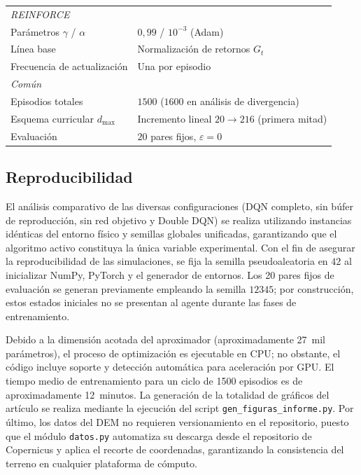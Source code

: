 \begin{table}[ht]
\begin{tabular}{lp{3.3cm}}
\midrule
\multicolumn{2}{l}{\textit{REINFORCE}} \\
Parámetros $\gamma$ / $\alpha$       & $0{,}99$ / $10^{-3}$ (Adam) \\
Línea base                           & Normalización de retornos $G_t$ \\
Frecuencia de actualización          & Una por episodio \\
\midrule
\multicolumn{2}{l}{\textit{Común}} \\
Episodios totales                    & $1500$ ($1600$ en análisis de divergencia) \\
Esquema curricular $d_{\max}$        & Incremento lineal $20 \to 216$ (primera mitad) \\
Evaluación                           & $20$ pares fijos, $\varepsilon=0$ \\
\bottomrule
\end{tabular}
\end{table}

\subsection{Reproducibilidad}
El análisis comparativo de las diversas configuraciones (DQN completo, sin búfer de reproducción, sin red objetivo y Double DQN) se realiza utilizando instancias idénticas del entorno físico y semillas globales unificadas, garantizando que el algoritmo activo constituya la única variable experimental. Con el fin de asegurar la reproducibilidad de las simulaciones, se fija la semilla pseudoaleatoria en $42$ al inicializar NumPy, PyTorch y el generador de entornos. Los 20 pares fijos de evaluación se generan previamente empleando la semilla $12345$; por construcción, estos estados iniciales no se presentan al agente durante las fases de entrenamiento.

Debido a la dimensión acotada del aproximador (aproximadamente 27~mil parámetros), el proceso de optimización es ejecutable en CPU; no obstante, el código incluye soporte y detección automática para aceleración por GPU. El tiempo medio de entrenamiento para un ciclo de 1500 episodios es de aproximadamente 12~minutos. La generación de la totalidad de gráficos del artículo se realiza mediante la ejecución del script \texttt{gen\_figuras\_informe.py}. Por último, los datos del DEM no requieren versionamiento en el repositorio, puesto que el módulo \texttt{datos.py} automatiza su descarga desde el repositorio de Copernicus y aplica el recorte de coordenadas, garantizando la consistencia del terreno en cualquier plataforma de cómputo.
